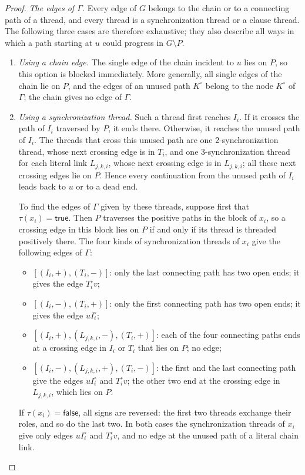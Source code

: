 \begin{proof}
\emph{The edges of $\Gamma$.}
Every edge of $G$ belongs to the chain or to a connecting path of a thread, and every thread is a synchronization thread or a clause thread.
The following three cases are therefore exhaustive; they also describe all ways in which a path starting at $u$ could progress in $G \setminus P$.
\begin{enumerate}
  \item \emph{Using a chain edge.}
  The single edge of the chain incident to $u$ lies on $P$, so this option is blocked immediately.
  More generally, all single edges of the chain lie on $P$, and the edges of an unused path $K^{\circ}$ belong to the node $K^{\circ}$ of $\Gamma$; the chain gives no edge of $\Gamma$.

  \item \emph{Using a synchronization thread.}
  Such a thread first reaches $I_i$.
  If it crosses the path of $I_i$ traversed by $P$, it ends there.
  Otherwise, it reaches the unused path of $I_i$.
  The threads that cross this unused path are one 2-synchronization thread, whose next crossing edge is in $T_i$, and one 3-synchronization thread for each literal link $L_{j,k,i}$, whose next crossing edge is in $L_{j,k,i}$; all these next crossing edges lie on $P$.
  Hence every continuation from the unused path of $I_i$ leads back to $u$ or to a dead end.

  To find the edges of $\Gamma$ given by these threads, suppose first that $\tau(x_i)=\mathsf{true}$.
  Then $P$ traverses the positive paths in the block of $x_i$, so a crossing edge in this block lies on $P$ if and only if its thread is threaded positively there.
  The four kinds of synchronization threads of $x_i$ give the following edges of $\Gamma$:
  \begin{itemize}
    \item $[(I_i,+),(T_i,-)]$: only the last connecting path has two open ends; it gives the edge $T_i^{\circ}v$;
    \item $[(I_i,-),(T_i,+)]$: only the first connecting path has two open ends; it gives the edge $uI_i^{\circ}$;
    \item $[(I_i,+),(L_{j,k,i},-),(T_i,+)]$: each of the four connecting paths ends at a crossing edge in $I_i$ or $T_i$ that lies on $P$; no edge;
    \item $[(I_i,-),(L_{j,k,i},+),(T_i,-)]$: the first and the last connecting path give the edges $uI_i^{\circ}$ and $T_i^{\circ}v$; the other two end at the crossing edge in $L_{j,k,i}$, which lies on $P$.
  \end{itemize}
  If $\tau(x_i)=\mathsf{false}$, all signs are reversed: the first two threads exchange their roles, and so do the last two.
  In both cases the synchronization threads of $x_i$ give only edges $uI_i^{\circ}$ and $T_i^{\circ}v$, and no edge at the unused path of a literal chain link.


\end{enumerate}
\end{proof}

